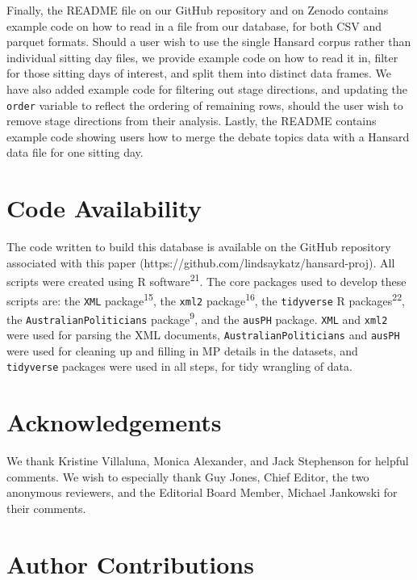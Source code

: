 \documentclass[
  letterpaper,
  DIV=11,
  numbers=noendperiod]{scrartcl}
\begin{document}
Finally, the README file on our GitHub repository and on Zenodo contains
example code on how to read in a file from our database, for both CSV
and parquet formats. Should a user wish to use the single Hansard corpus
rather than individual sitting day files, we provide example code on how
to read it in, filter for those sitting days of interest, and split them
into distinct data frames. We have also added example code for filtering
out stage directions, and updating the \texttt{order} variable to
reflect the ordering of remaining rows, should the user wish to remove
stage directions from their analysis. Lastly, the README contains
example code showing users how to merge the debate topics data with a
Hansard data file for one sitting day.

\hypertarget{code-availability}{%
\section{Code Availability}\label{code-availability}}

The code written to build this database is available on the GitHub
repository associated with this paper
(https://github.com/lindsaykatz/hansard-proj). All scripts were created
using R software\textsuperscript{21}. The core packages used to develop
these scripts are: the \texttt{XML} package\textsuperscript{15}, the
\texttt{xml2} package\textsuperscript{16}, the \texttt{tidyverse} R
packages\textsuperscript{22}, the \texttt{AustralianPoliticians}
package\textsuperscript{9}, and the \texttt{ausPH} package. \texttt{XML}
and \texttt{xml2} were used for parsing the XML documents,
\texttt{AustralianPoliticians} and \texttt{ausPH} were used for cleaning
up and filling in MP details in the datasets, and \texttt{tidyverse}
packages were used in all steps, for tidy wrangling of data.

\hypertarget{acknowledgements}{%
\section{Acknowledgements}\label{acknowledgements}}

We thank Kristine Villaluna, Monica Alexander, and Jack Stephenson for
helpful comments. We wish to especially thank Guy Jones, Chief Editor,
the two anonymous reviewers, and the Editorial Board Member, Michael
Jankowski for their comments.

\hypertarget{author-contributions}{%
\section{Author Contributions}\label{author-contributions}}
\end{document}
